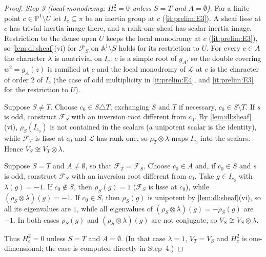 \begin{proof}
\emph{Step 3 (local monodromy: $H^2_c=0$ unless $S=T$ and
$A=\emptyset$).} For a finite point $c\in\mathbb P^1\setminus U$ let
$I_c\subseteq\pi$ be an inertia group at $c$ (\ref{it:prelim:E3}). A sheaf lisse
at $c$ has trivial inertia image there, and a rank-one sheaf has scalar inertia
image. Restriction to the dense open $U$ keeps the local monodromy at $c$
(\ref{it:prelim:E3}), so \cref{lem:dl:sheaf}(vi) for $\mathcal F_S$ on
$\mathbb A^1\setminus S$ holds for its restriction to $U$. For every $c\in A$
the character $\lambda$ is nontrivial on $I_c$: $c$ is a simple root of $g_A$, so
the double covering $w^2=g_A(z)$ is ramified at $c$ and the local monodromy of
$\mathcal L$ at $c$ is the character of order $2$ of $I_c$ (the case of odd
multiplicity in \ref{it:prelim:E4}, and \ref{it:prelim:E3} for the restriction
to $U$).

Suppose $S\ne T$. Choose $c_0\in S\triangle T$; exchanging $S$ and $T$ if
necessary, $c_0\in S\setminus T$. If $s$ is odd, construct $\mathcal F_S$ with an
inversion root different from $c_0$. By \cref{lem:dl:sheaf}(vi),
$\rho_S(I_{c_0})$ is not contained in the scalars (a unipotent scalar is the
identity), while $\mathcal F_T$ is lisse at $c_0$ and $\mathcal L$ has rank one,
so $\rho_T\otimes\lambda$ maps $I_{c_0}$ into the scalars. Hence
$V_S\not\cong V_T\otimes\lambda$.

Suppose $S=T$ and $A\ne\emptyset$, so that $\mathcal F_T=\mathcal F_S$. Choose
$c_0\in A$ and, if $c_0\in S$ and $s$ is odd, construct $\mathcal F_S$ with an
inversion root different from $c_0$. Take $g\in I_{c_0}$ with $\lambda(g)=-1$.
If $c_0\notin S$, then $\rho_S(g)=1$ ($\mathcal F_S$ is lisse at $c_0$), while
$(\rho_S\otimes\lambda)(g)=-1$. If $c_0\in S$, then $\rho_S(g)$ is unipotent by
\cref{lem:dl:sheaf}(vi), so all its eigenvalues are $1$, while all eigenvalues of
$(\rho_S\otimes\lambda)(g)=-\rho_S(g)$ are $-1$. In both cases $\rho_S(g)$ and
$(\rho_S\otimes\lambda)(g)$ are not conjugate, so $V_S\not\cong V_S\otimes\lambda$.

Thus $H^2_c=0$ unless $S=T$ and $A=\emptyset$. (In that case $\lambda=1$,
$V_T=V_S$ and $H^2_c$ is one-dimensional; the case is computed directly in
Step~4.)


\end{proof}
